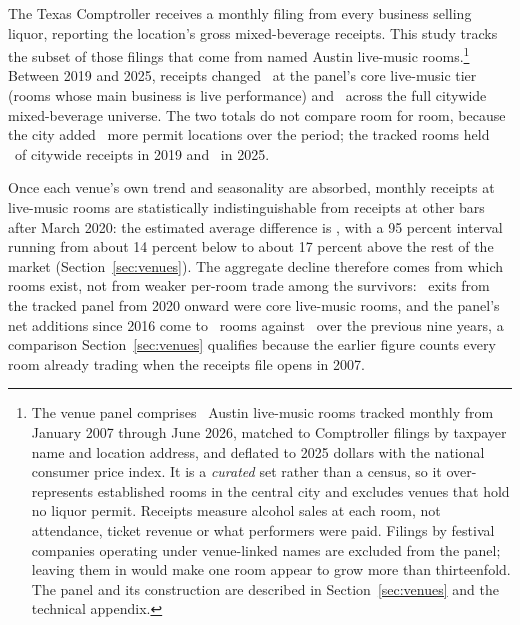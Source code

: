 The Texas Comptroller receives a monthly filing from every business selling
liquor, reporting the location's gross mixed-beverage receipts. This study
tracks the subset of those filings that come from named Austin live-music
rooms.\footnote{The venue panel comprises \NVenuePanelIsCurated\ Austin
live-music rooms tracked monthly from January 2007 through June 2026, matched
to Comptroller filings by taxpayer name and location address, and deflated to
2025 dollars with the national consumer price index. It is a \emph{curated} set
rather than a census, so it over-represents established rooms in the central
city and excludes venues that hold no liquor permit. Receipts measure alcohol
sales at each room, not attendance, ticket revenue or what performers were
paid. Filings by festival companies operating under venue-linked names are
excluded from the panel; leaving them in would make one room appear to grow
more than thirteenfold. The panel and its construction are described in
Section~\ref{sec:venues} and the technical appendix.} Between 2019 and 2025,
receipts changed \NVenueCorePctTwoZeroOneNineTwoZeroTwoFive\ at the panel's
core live-music tier (rooms whose main business is live performance) and
\NVenueCitywidePctTwoZeroOneNineTwoZeroTwoFive\ across the full citywide
mixed-beverage universe. The two totals do not compare room for room, because
the city added
\NVenueCitywidePermitsPctTwoZeroOneNineTwoZeroTwoFive\ more permit locations
over the period; the tracked rooms held
\NVenuePanelShareTwoZeroOneNine\ of citywide receipts in 2019 and
\NVenuePanelShareTwoZeroTwoFive\ in 2025.

Once each venue's own trend and seasonality are absorbed, monthly receipts at
live-music rooms are statistically indistinguishable from receipts at other
bars after March 2020: the estimated average difference is \NVenueDidPct, with
a 95 percent interval running from about 14 percent below to about 17 percent
above the rest of the market (Section~\ref{sec:venues}). The aggregate decline
therefore comes from which rooms exist, not from weaker per-room trade among
the survivors: \NVenueExitsTwoZeroTwoZeroTwoZeroTwoSixCore\ exits from the tracked
panel from 2020 onward were core live-music rooms, and the panel's net additions
since 2016 come to \NVenueNetAddsTwoZeroOneSixTwoZeroTwoSix\ rooms against
\NVenueNetAddsTwoZeroZeroSevenTwoZeroOneFive\ over the previous nine years, a
comparison Section~\ref{sec:venues} qualifies because the earlier figure counts
every room already trading when the receipts file opens in 2007.

